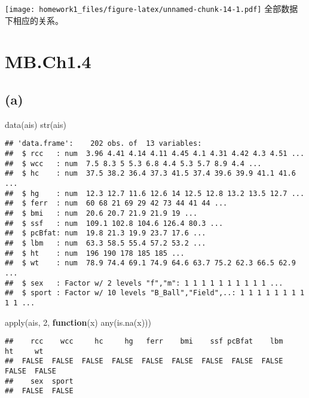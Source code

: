 \documentclass[
]{article}
\newenvironment{Shaded}{\begin{snugshade}}{\end{snugshade}}
\newcommand{\ControlFlowTok}[1]{\textcolor[rgb]{0.13,0.29,0.53}{\textbf{#1}}}
\newcommand{\DecValTok}[1]{\textcolor[rgb]{0.00,0.00,0.81}{#1}}
\newcommand{\FunctionTok}[1]{\textcolor[rgb]{0.00,0.00,0.00}{#1}}
\newcommand{\NormalTok}[1]{#1}
\begin{document}
\texttt{[image: homework1\_files/figure-latex/unnamed-chunk-14-1.pdf]}
全部数据下相应的关系。

\hypertarget{mb.ch1.4}{%
\section{MB.Ch1.4}\label{mb.ch1.4}}

\hypertarget{a-3}{%
\subsection{(a)}\label{a-3}}

\begin{Shaded}
\begin{Highlighting}[]
\FunctionTok{data}\NormalTok{(ais)}
\FunctionTok{str}\NormalTok{(ais)}
\end{Highlighting}
\end{Shaded}

\begin{verbatim}
## 'data.frame':    202 obs. of  13 variables:
##  $ rcc   : num  3.96 4.41 4.14 4.11 4.45 4.1 4.31 4.42 4.3 4.51 ...
##  $ wcc   : num  7.5 8.3 5 5.3 6.8 4.4 5.3 5.7 8.9 4.4 ...
##  $ hc    : num  37.5 38.2 36.4 37.3 41.5 37.4 39.6 39.9 41.1 41.6 ...
##  $ hg    : num  12.3 12.7 11.6 12.6 14 12.5 12.8 13.2 13.5 12.7 ...
##  $ ferr  : num  60 68 21 69 29 42 73 44 41 44 ...
##  $ bmi   : num  20.6 20.7 21.9 21.9 19 ...
##  $ ssf   : num  109.1 102.8 104.6 126.4 80.3 ...
##  $ pcBfat: num  19.8 21.3 19.9 23.7 17.6 ...
##  $ lbm   : num  63.3 58.5 55.4 57.2 53.2 ...
##  $ ht    : num  196 190 178 185 185 ...
##  $ wt    : num  78.9 74.4 69.1 74.9 64.6 63.7 75.2 62.3 66.5 62.9 ...
##  $ sex   : Factor w/ 2 levels "f","m": 1 1 1 1 1 1 1 1 1 1 ...
##  $ sport : Factor w/ 10 levels "B_Ball","Field",..: 1 1 1 1 1 1 1 1 1 1 ...
\end{verbatim}

\begin{Shaded}
\begin{Highlighting}[]
\FunctionTok{apply}\NormalTok{(ais, }\DecValTok{2}\NormalTok{, }\ControlFlowTok{function}\NormalTok{(x) }\FunctionTok{any}\NormalTok{(}\FunctionTok{is.na}\NormalTok{(x)))}
\end{Highlighting}
\end{Shaded}

\begin{verbatim}
##    rcc    wcc     hc     hg   ferr    bmi    ssf pcBfat    lbm     ht     wt 
##  FALSE  FALSE  FALSE  FALSE  FALSE  FALSE  FALSE  FALSE  FALSE  FALSE  FALSE 
##    sex  sport 
##  FALSE  FALSE
\end{verbatim}
\end{document}
